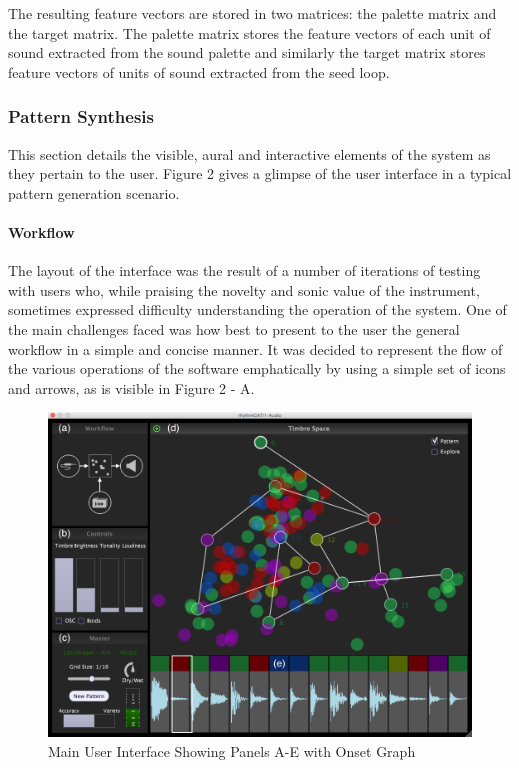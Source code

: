 The resulting feature vectors are stored in two matrices: the palette matrix and the target matrix. The palette matrix stores the feature vectors of each unit of sound extracted from the sound palette and similarly the target matrix stores feature vectors of units of sound extracted from the seed loop.



\subsubsection{Pattern Synthesis}

This section details the visible, aural and interactive elements of the system as they pertain to the user. Figure 2 gives a glimpse of the user interface in a typical pattern generation scenario.

\paragraph{Workflow}

The layout of the interface was the result of a number of iterations of testing with users who, while praising the novelty and sonic value of the instrument, sometimes expressed difficulty understanding the operation of the system. One of the main challenges faced was how best to present to the user the general workflow in a simple and concise manner. It was decided to represent the flow of the various operations of the software emphatically by using a simple set of icons and arrows, as is visible in Figure 2 - A.

\begin{figure}
	\begin{center}
		\includegraphics[width=1.0\textwidth]{ch05_pyconcat/figures/rhythmcat.png}
	\end{center}
	\caption[Main User Interface Showing Panels A-E with Onset Graph]{Main User Interface Showing Panels A-E with Onset Graph}
	\label{fig:rhythmcat_interface}
\end{figure}
 
